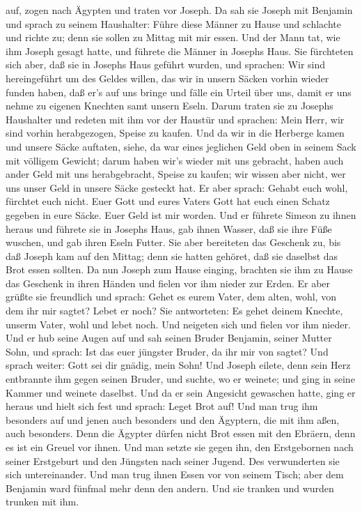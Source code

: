 auf, zogen nach Ägypten und traten vor Joseph.  Da sah sie
Joseph mit Benjamin und sprach zu seinem Haushalter: Führe diese Männer
zu Hause und schlachte und richte zu; denn sie sollen zu Mittag mit mir
essen.  Und der Mann tat, wie ihm Joseph gesagt hatte, und
führete die Männer in Josephs Haus.  Sie fürchteten sich
aber, daß sie in Josephs Haus geführt wurden, und sprachen: Wir sind
hereingeführt um des Geldes willen, das wir in unsern Säcken vorhin
wieder funden haben, daß er's auf uns bringe und fälle ein Urteil über
uns, damit er uns nehme zu eigenen Knechten samt unsern Eseln.
 Darum traten sie zu Josephs Haushalter und redeten mit ihm
vor der Haustür  und sprachen: Mein Herr, wir sind vorhin
herabgezogen, Speise zu kaufen.  Und da wir in die Herberge
kamen und unsere Säcke auftaten, siehe, da war eines jeglichen Geld oben
in seinem Sack mit völligem Gewicht; darum haben wir's wieder mit uns
gebracht,  haben auch ander Geld mit uns herabgebracht,
Speise zu kaufen; wir wissen aber nicht, wer uns unser Geld in unsere
Säcke gesteckt hat.  Er aber sprach: Gehabt euch wohl,
fürchtet euch nicht. Euer Gott und eures Vaters Gott hat euch einen
Schatz gegeben in eure Säcke. Euer Geld ist mir worden. Und er führete
Simeon zu ihnen heraus  und führete sie in Josephs Haus,
gab ihnen Wasser, daß sie ihre Füße wuschen, und gab ihren Eseln Futter.
 Sie aber bereiteten das Geschenk zu, bis daß Joseph kam
auf den Mittag; denn sie hatten gehöret, daß sie daselbst das Brot essen
sollten.  Da nun Joseph zum Hause einging, brachten sie ihm
zu Hause das Geschenk in ihren Händen und fielen vor ihm nieder zur
Erden.  Er aber grüßte sie freundlich und sprach: Gehet es
eurem Vater, dem alten, wohl, von dem ihr mir sagtet? Lebet er noch?
 Sie antworteten: Es gehet deinem Knechte, unserm Vater,
wohl und lebet noch. Und neigeten sich und fielen vor ihm nieder.
 Und er hub seine Augen auf und sah seinen Bruder Benjamin,
seiner Mutter Sohn, und sprach: Ist das euer jüngster Bruder, da ihr mir
von sagtet? Und sprach weiter: Gott sei dir gnädig, mein Sohn!
 Und Joseph eilete, denn sein Herz entbrannte ihm gegen
seinen Bruder, und suchte, wo er weinete; und ging in seine Kammer und
weinete daselbst.  Und da er sein Angesicht gewaschen
hatte, ging er heraus und hielt sich fest und sprach: Leget Brot auf!
 Und man trug ihm besonders auf und jenen auch besonders
und den Ägyptern, die mit ihm aßen, auch besonders. Denn die Ägypter
dürfen nicht Brot essen mit den Ebräern, denn es ist ein Greuel vor
ihnen.  Und man setzte sie gegen ihn, den Erstgebornen nach
seiner Erstgeburt und den Jüngsten nach seiner Jugend. Des verwunderten
sie sich untereinander.  Und man trug ihnen Essen vor von
seinem Tisch; aber dem Benjamin ward fünfmal mehr denn den andern. Und
sie tranken und wurden trunken mit ihm.

